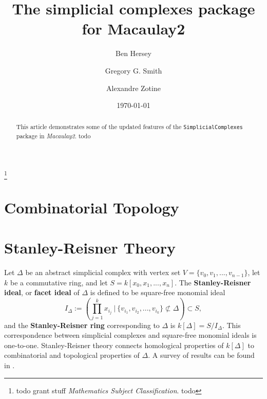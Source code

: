 \documentclass[12pt,leqno]{amsart}
\theoremstyle{definition}
\begin{document}
\title[Simplicial Complexes]{The simplicial complexes package for Macaulay2}
\author[B.~Hersey]{Ben Hersey}
\address{Ben Hersey: Department of Mathematics and Statistics, Queen's University, Kingston, Ontario, K7L 3N6;
  {\normalfont \texttt{b.hersey@queensu.ca}}}

\author[G.G.~Smith]{Gregory G.{} Smith}
\address{Gregory G.{} Smith: Department of Mathematics and Statistics, Queen's
  University, Kingston, Ontario, K7L 3N6, Canada; {\normalfont
    \texttt{ggsmith@mast.queensu.ca}}}

\author[A.~Zotine]{Alexandre Zotine}
\address{Alexandre Zotine: Department of Mathematics and Statistics, Queen's University, Kingston, Ontario, K7L 3N6;
  {\normalfont \texttt{18az45@queensu.ca}}}

\thanks{todo grant stuff \emph{Mathematics Subject Classification}. todo}
\date{\today}

\begin{abstract}
  This article demonstrates some of the updated features of the \texttt{SimplicialComplexes} package in \emph{Macaulay2}. todo
\end{abstract}

\maketitle


\addtocounter{section}{1}
\addtocounter{lemma}{-1}

\noindent

\section{Combinatorial Topology}



\section{Stanley-Reisner Theory}

\noindent
Let $\Delta$ be an abstract simplicial complex with vertex set $V = \{v_0,v_1,...,v_{n-1}\}$, let $k$ be a commutative ring, and let $S = k[x_0,x_1,...,x_n]$. The \textbf{Stanley-Reisner ideal}, or \textbf{facet ideal} of $\Delta$ is defined to be square-free monomial ideal
%
\begin{displaymath}
  I_\Delta := \left( \prod_{j=1}^k x_{i_j} \ \bigg\vert \ \{ v_{i_1},v_{i_2},...,v_{i_k} \} \not \subset \Delta \right) \subset S,
\end{displaymath}
%
and the \textbf{Stanley-Reisner ring} corresponding to $\Delta$ is $k[\Delta] = S/I_\Delta$. This correspondence between simplicial complexes and square-free monomial ideals is one-to-one. Stanley-Reisner theory connects homological properties of $k[\Delta]$ to combinatorial and topological properties of $\Delta$. A survey of results can be found in \cite{BH, Stanley, MS}.
\end{document}
